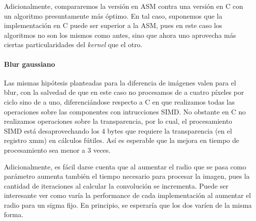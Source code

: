 Adicionalmente, compararemos la versión en ASM contra una versión en C con un algoritmo presuntamente más óptimo. En tal caso, suponemos que la implementación en C puede ser superior a la ASM, pues en este caso los algoritmos no son los mismos como antes, sino que ahora uno aprovecha más ciertas particularidades del \emph{kernel} que el otro.


\paragraph*{Blur gaussiano}
Las mismas hipótesis planteadas para la diferencia de imágenes valen para el blur, con la salvedad de que en este caso no procesamos de a cuatro píxeles por ciclo sino de a uno, diferenciándose respecto a C en que realizamos todas las operaciones sobre las componentes con intrucciones SIMD. No obstante en C no realizamos operaciones sobre la transparencia, por lo cual, el procesamiento SIMD está desaprovechando los 4 bytes que requiere la transparencia (en el registro xmm) en cálculos fútiles. Así es esperable que la mejora en tiempo de procesamiento sea menor a 3 veces. 

Adicionalmente, es fácil darse cuenta que al aumentar el radio que se pasa como parámetro aumenta también el tiempo necesario para procesar la imagen, pues la cantidad de iteraciones al calcular la convolución se incrementa. Puede ser interesante ver como varía la performance de cada implementación al aumentar el radio para un sigma fijo. En principio, se esperaría que los dos varíen de la misma forma. 

